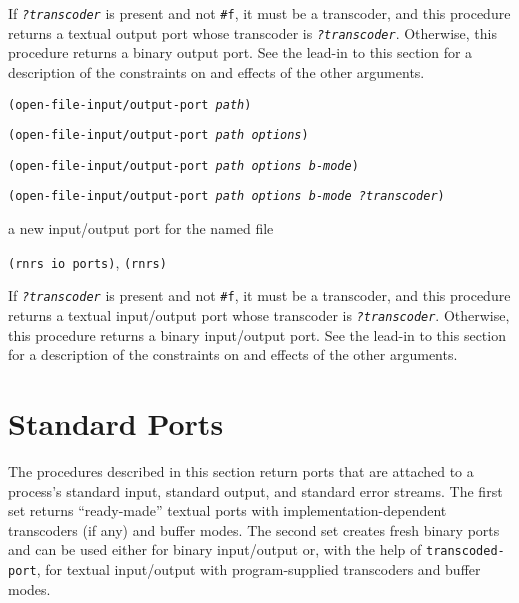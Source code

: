 If \texttt{\textit{?transcoder}} is present and not \texttt{\#{}f}, it must be a
transcoder, and this procedure returns a textual output port
whose transcoder is \texttt{\textit{?transcoder}}.
Otherwise, this procedure returns a binary output port.
See the lead-in to this section for a description of the constraints
on and effects of the other arguments.


\begin{description}

\label{io_s31}\item[procedure] \texttt{(open-file-input/output-port \textit{path})}



\item[procedure] \texttt{(open-file-input/output-port \textit{path} \textit{options})}



\item[procedure] \texttt{(open-file-input/output-port \textit{path} \textit{options} \textit{b-mode})}



\item[procedure] \texttt{(open-file-input/output-port \textit{path} \textit{options} \textit{b-mode} \textit{?transcoder})}



\item[returns] a new input/output port for the named file


\item[libraries] \texttt{(rnrs io ports)}, \texttt{(rnrs)}
\end{description}


If \texttt{\textit{?transcoder}} is present and not \texttt{\#{}f}, it must be a
transcoder, and this procedure returns a textual input/output port
whose transcoder is \texttt{\textit{?transcoder}}.
Otherwise, this procedure returns a binary input/output port.
See the lead-in to this section for a description of the constraints
on and effects of the other arguments.



\section{\label{io_g124}\label{io_h3}Standard Ports\label{io_SECTSTANDARDPORTS}}



The procedures described in this section return ports that are attached to
a process's standard input, standard output, and standard error streams.
The first set returns ``ready-made'' textual ports with implementation-dependent
transcoders (if any) and buffer modes.
The second set creates fresh binary ports and can be used either for binary
input/output or, with the help of \texttt{transcoded-port}, for textual
input/output with program-supplied transcoders and buffer modes.

